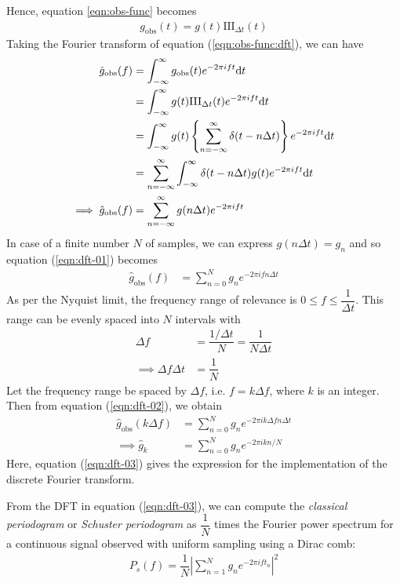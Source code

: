     			Hence, equation \ref{eqn:obs-func} becomes
    			\begin{align}
    				g_\text{obs}(t)=g(t)\text{III}_{\Delta t}(t) \label{eqn:obs-func:dft}
    			\end{align}
    			Taking the Fourier transform of equation (\ref{eqn:obs-func:dft}), we can have
    			\begin{align}
    				\hat{g}_\text{obs}(f)&=\int_{-\infty}^{\infty}{g_\text{obs}(t) e^{-2\pi i f t}\mathrm{d}t} \nonumber \\
    					&=\int_{-\infty}^{\infty}{g(t)\text{III}_{\Delta t}(t) e^{-2\pi i f t}\mathrm{d}t} \nonumber \\
    					&=\int_{-\infty}^{\infty}{g(t)\left\lbrace \sum_{n=-\infty}^{\infty}{\delta(t-n\Delta t)} \right\rbrace e^{-2\pi i f t}\mathrm{d}t} \nonumber \\
    					&=\sum_{n=-\infty}^{\infty}{\int_{-\infty}^{\infty}{\delta(t-n\Delta t)g(t)e^{-2\pi ift}\mathrm{d}t}} \nonumber \\
    				\implies\hat{g}_\text{obs}(f)&=\sum_{n=-\infty}^{\infty}{g(n\Delta t)e^{-2\pi ift}} \label{eqn:dft-01}
    			\end{align}
    			In case of a finite number $N$ of samples, we can express $g(n\Delta t)=g_n$ and so equation (\ref{eqn:dft-01}) becomes
    			\begin{align}
    				\hat{g}_\text{obs}(f)&=\sum_{n=0}^{N}{g_ne^{-2\pi ifn\Delta t}} \label{eqn:dft-02}
    			\end{align}
    			As per the Nyquist limit, the frequency range of relevance is $0\leqslant f\leqslant\dfrac{1}{\Delta t}$. This range can be evenly spaced into $N$ intervals with
    			\begin{align*}
    				\Delta f&=\dfrac{1/{\Delta t}}{N}=\dfrac{1}{N\Delta t} \\
    				\implies\Delta f\Delta t&=\dfrac{1}{N}
    			\end{align*}
    			Let the frequency range be spaced by $\Delta f$, i.e. $f=k\Delta f$, where $k$ is an integer. Then from equation (\ref{eqn:dft-02}), we obtain
    			\begin{align}
    				\hat{g}_\text{obs}(k\Delta f)&=\sum_{n=0}^{N}{g_ne^{-2\pi ik\Delta fn\Delta t}} \nonumber \\
    				\implies \hat{g}_k&=\sum_{n=0}^{N}{g_ne^{-2\pi ikn/N}} \label{eqn:dft-03}
    			\end{align}
    			Here, equation (\ref{eqn:dft-03}) gives the expression for the implementation of the discrete Fourier transform.
    			
    			From the DFT in equation (\ref{eqn:dft-03}), we can compute the \textit{classical periodogram} or \textit{Schuster periodogram} \cite{schuster1898investigation} as $\dfrac{1}{N}$ times the Fourier power spectrum for a continuous signal observed with uniform sampling using a Dirac comb:
    			\begin{align}
    				P_s(f)=\dfrac{1}{N}\left| \sum_{n=1}^{N}{g_ne^{-2\pi i ft_n}} \right|^2 \label{eqn:schuster-periodogram}
    			\end{align}
    		
